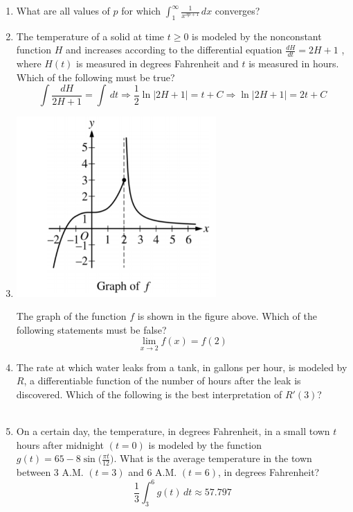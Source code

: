 \documentclass[12pt]{article}
\begin{document}
\begin{enumerate}
\begin{center}
    \end{center}
    \item What are all values of $p$ for which $\int_{1}^{\infty}\frac{1}{x^{3p+1}}\,dx$ converges?
    \item The temperature of a solid at time  $t \geq 0$  is modeled by the nonconstant function $H$ and increases according to the differential equation $\frac{dH}{dt}=2H+1$ , where $H(t)$  is measured in degrees Fahrenheit and $t$ is measured in hours. Which of the following must be true?
    $$\int \frac{dH}{2H+1} = \int \, dt \Longrightarrow \frac{1}{2}\ln|2H+1| = t+C \Longrightarrow \boxed{\ln|2H+1| = 2t+C}$$
    \item 
        \begin{center}
            \includegraphics[width=3in]{FEP9.png}
        \end{center}
    The graph of the function $f$ is shown in the figure above. Which of the following statements must be false?
    $$\boxed{\lim_{x\to2} f(x)= f(2)}$$
    \item The rate at which water leaks from a tank, in gallons per hour, is modeled by $R$, a differentiable function of the number of hours after the leak is discovered. Which of the following is the best interpretation of $R'(3)$?\\\\
    \noindent{}
    \item On a certain day, the temperature, in degrees Fahrenheit, in a small town $t$ hours after midnight $(t= 0)$  is modeled by the function $g(t) = 65 - 8\sin \bigg(\frac{\pi t}{12}\bigg)$. What is the average temperature in the town between 3 A.M. $(t= 3)$  and 6 A.M. $(t= 6)$, in degrees Fahrenheit?
    $$\boxed{\frac{1}{3}\int_{3}^{6} g(t)\, dt \approx 57.797 }$$

\end{enumerate}
\end{document}
